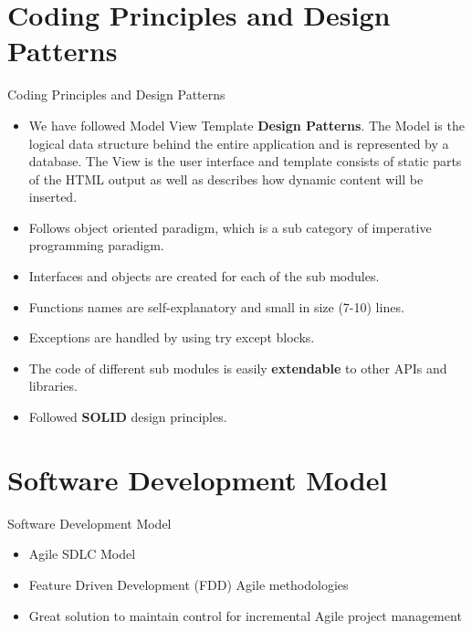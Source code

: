 \documentclass{beamer}
\begin{document}
\section{Coding Principles and Design Patterns}
\begin{frame}{Coding Principles and Design Patterns}
    \begin{itemize}
        \item We have followed Model View Template \textbf{Design Patterns}. The Model is the logical data structure behind the entire application and is represented by a database. The View is the user interface and template consists of static parts of the HTML output as well as describes how dynamic content will be inserted. 

        \item Follows object oriented paradigm, which is a sub category of imperative programming paradigm. 

        \item Interfaces and objects are created for each of the sub modules.
        \item Functions names are self-explanatory and small in size (7-10) lines.
        \item Exceptions are handled by using try except blocks.
        \item The code of different sub modules is easily \textbf{extendable} to other APIs and libraries.
        \item Followed \textbf{SOLID} design principles.
    \end{itemize}
\end{frame}

\section{Software Development Model}
\begin{frame}{Software Development Model}
    \begin{itemize}
        \item Agile SDLC Model
        \item Feature Driven Development (FDD) Agile methodologies 
        \item Great solution to maintain control for incremental Agile project management 
    \end{itemize}
\end{frame}
\end{document}
